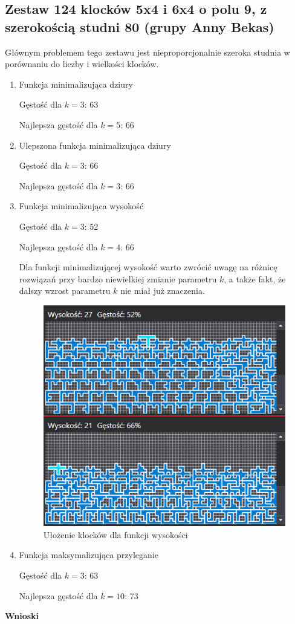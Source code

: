 \documentclass{article}
\begin{document}
\subsection{Zestaw 124 klocków 5x4 i 6x4 o polu 9, z szerokością studni 80 (grupy Anny Bekas)}
Głównym problemem tego zestawu jest nieproporcjonalnie szeroka studnia w porównaniu do liczby i wielkości klocków.
\begin{enumerate}

\item Funkcja minimalizująca dziury

Gęstość dla $k=3$: 63

Najlepsza gęstość dla $k=5$: 66

\item Ulepszona funkcja minimalizująca dziury

Gęstość dla $k=3$: 66

Najlepsza gęstość dla $k=3$: 66

\item Funkcja minimalizująca wysokość

Gęstość dla $k=3$: 52

Najlepsza gęstość dla $k=4$: 66

Dla funkcji minimalizującej wysokość warto zwrócić uwagę na różnicę rozwiązań przy bardzo niewielkiej zmianie parametru $k$, a także fakt, że dalszy wzrost parametru $k$ nie miał już znaczenia.
\begin{figure}[H]
\centering
\includegraphics[width=\textwidth]{wysokosc_bekas.PNG}
\caption{Ułożenie klocków dla funkcji wysokości}
\end{figure}


\item Funkcja maksymalizująca przyleganie

Gęstość dla $k=3$: 63

Najlepsza gęstość dla $k=10$: 73

\end{enumerate}
\textbf{Wnioski}
\end{document}
